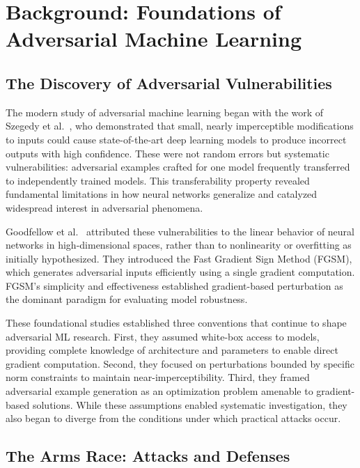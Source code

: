 \documentclass[11pt,a4paper]{article}
\begin{document}
\section{Background: Foundations of Adversarial Machine Learning}

\subsection{The Discovery of Adversarial Vulnerabilities}

The modern study of adversarial machine learning began with the work of Szegedy et al.~\citep{szegedy2013intriguing}, who demonstrated that small, nearly imperceptible modifications to inputs could cause state-of-the-art deep learning models to produce incorrect outputs with high confidence. These were not random errors but systematic vulnerabilities: adversarial examples crafted for one model frequently transferred to independently trained models. This transferability property revealed fundamental limitations in how neural networks generalize and catalyzed widespread interest in adversarial phenomena.

Goodfellow et al.~\citep{goodfellow2014explaining} attributed these vulnerabilities to the linear behavior of neural networks in high-dimensional spaces, rather than to nonlinearity or overfitting as initially hypothesized. They introduced the Fast Gradient Sign Method (FGSM), which generates adversarial inputs efficiently using a single gradient computation. FGSM's simplicity and effectiveness established gradient-based perturbation as the dominant paradigm for evaluating model robustness.

These foundational studies established three conventions that continue to shape adversarial ML research. First, they assumed white-box access to models, providing complete knowledge of architecture and parameters to enable direct gradient computation. Second, they focused on perturbations bounded by specific norm constraints to maintain near-imperceptibility. Third, they framed adversarial example generation as an optimization problem amenable to gradient-based solutions. While these assumptions enabled systematic investigation, they also began to diverge from the conditions under which practical attacks occur.

\subsection{The Arms Race: Attacks and Defenses}
\end{document}
